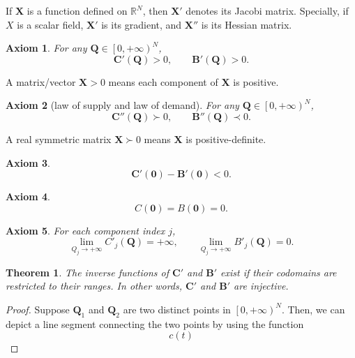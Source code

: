 \documentclass{article}
\newtheorem{axiom}{Axiom}[subsection]
\newtheorem{theorem}{Theorem}[subsection]
\begin{document}
If $\mathbf X$ is a function defined on $\mathbb R^N$, then $\mathbf X'$ denotes its Jacobi matrix.
Specially, if $X$ is a scalar field, $\mathbf X'$ is its gradient, and $\mathbf X''$ is its Hessian matrix.

\begin{axiom}
\label{multi monoticity}
For any $\mathbf Q\in\left[0,+\infty\right)^N$,
$$\mathbf C'\!\left(\mathbf Q\right)>0,\qquad\mathbf B'\!\left(\mathbf Q\right)>0.$$
\end{axiom}

A matrix/vector $\mathbf X>0$ means each component of $\mathbf X$ is positive.

\begin{axiom}[law of supply and law of demand]
\label{multi law of supply and law of demand}
For any $\mathbf Q\in\left[0,+\infty\right)^N$,
$$\mathbf C''\!\left(\mathbf Q\right)\succ0,\qquad\mathbf B''\!\left(\mathbf Q\right)\prec0.$$
\end{axiom}

A real symmetric matrix $\mathbf X\succ0$ means $\mathbf X$ is positive-definite.

\begin{axiom}
$$\mathbf C'\!\left(\mathbf0\right)-\mathbf B'\!\left(\mathbf0\right)<0.$$
\end{axiom}

\begin{axiom}
$$C\!\left(\mathbf0\right)=B\!\left(\mathbf0\right)=0.$$
\end{axiom}

\begin{axiom}
For each component index $j$,
$$\lim_{Q_j\to+\infty}C'_j\!\left(\mathbf Q\right)=+\infty,
\qquad\lim_{Q_j\to+\infty}B'_j\!\left(\mathbf Q\right)=0.$$
\end{axiom}

\begin{theorem}
The inverse functions of $\mathbf C'$ and $\mathbf B'$ exist if their codomains are restricted to their ranges.
In other words, $\mathbf C'$ and $\mathbf B'$ are injective.
\end{theorem}
\begin{proof}
Suppose $\mathbf Q_1$ and $\mathbf Q_2$ are two distinct points in $\left[0,+\infty\right)^N$.
Then, we can depict a line segment connecting the two points by using the function
\begin{equation*}
c\!\left(t\right)
\end{equation*}
\end{proof}
\end{document}
